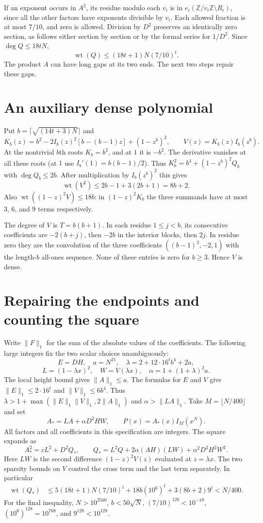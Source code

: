 \documentclass[11pt]{article}
\newcommand{\wt}{\operatorname{wt}}
\newcommand{\Z}{\mathbb Z}
\begin{document}
If an exponent occurs in $A^2$, its residue modulo each $v_i$ is in $e_i(\Z/v_i\Z\setminus R_i)$, since all the other factors have exponents divisible by $v_i$. Each allowed fraction is at most $7/10$, and zero is allowed. Division by $D^2$ preserves an identically zero section, as follows either section by section or by the formal series for $1/D^2$. Since $\deg Q\leq18tN$,
\begin{equation}\label{q}
 \wt(Q)\leq (18t+1)N(7/10)^t.
\end{equation}
The product $A$ can have long gaps at its two ends. The next two steps repair these gaps.
\section{An auxiliary dense polynomial}
Put $b=\lceil\sqrt{(14t+3)N}\rceil$ and
\[
 K_b(z)=b^2-2I_b(z)^2[b-(b-1)z]+(1-z^b)^2,\qquad
 V(z)=K_b(z)I_b(z^b).
\]
At the nontrivial $b$th roots $K_b=b^2$, and at $1$ it is $-b^2$. The derivative vanishes at all these roots (at $1$ use $I_b'(1)=b(b-1)/2$). Thus $K_b^2=b^4+(1-z^b)^2Q_b$ with $\deg Q_b\leq2b$. After multiplication by $I_b(z^b)^2$ this gives
\[
 \wt(V^2)\leq 2b-1+3(2b+1)=8b+2.
\]
Also $\wt((1-z)^2V)\leq18b$: in $(1-z)^2K_b$ the three summands have at most $3$, $6$, and $9$ terms respectively.

The degree of $V$ is $T=b(b+1)$. In each residue $1\leq j<b$, its consecutive coefficients are $-2(b+j)$, then $-2b$ in the interior blocks, then $2j$. In residue zero they are the convolution of the three coefficients $((b-1)^2,-2,1)$ with the length-$b$ all-ones sequence. None of these entries is zero for $b\geq3$. Hence $V$ is dense.
\section{Repairing the endpoints and counting the square}
Write $\|F\|_1$ for the sum of the absolute values of the coefficients. The following large integers fix the two scalar choices unambiguously:
\[
 E=DH,\quad a=N^{21},\quad \lambda=2+12\cdot16^t b^4+2a,
\]
\[
 L=(1-\lambda x)^2,\quad W=V(\lambda x),\quad
 \alpha=1+(1+\lambda)^2a.
\]
The local height bound gives $\|A\|_1\leq a$. The formulas for $E$ and $V$ give $\|E\|_1\leq 2\cdot16^t$ and $\|V\|_1\leq 6b^4$. Thus $\lambda>1+\max(\|E\|_1\|V\|_1,2\|A\|_1)$ and $\alpha>\|LA\|_1$. Take $M=\lfloor N/400\rfloor$ and set
\begin{equation}\label{witness}
 A_* = LA+\alpha D^2 HW,\qquad P(x)=A_*(x) I_M(x^N).
\end{equation}
All factors and all coefficients in this specification are integers. The square expands as
\[
 A_*^2=cL^2+D^2 Q_*,\qquad
 Q_* = L^2 Q+2\alpha(AH)(LW)+\alpha^2D^2H^2W^2 .
\]
Here $LW$ is the second difference $(1-z)^2V(z)$ evaluated at $z=\lambda x$. The two sparsity bounds on $V$ control the cross term and the last term separately. In particular
\begin{align*}
 \wt(Q_*) &\leq 5(18t+1)N(7/10)^t
       +18b(10^6)^t+3(8b+2)9^t < N/400 .
\end{align*}
For the final inequality, $N>10^{2560}$, $b<50\sqrt N$, $(7/10)^{128}<10^{-19}$, $(10^6)^{128}=10^{768}$, and $9^{128}<10^{128}$.
\end{document}

